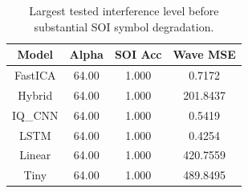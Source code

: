 \begin{table}[t]
\centering
\caption{Largest tested interference level before substantial SOI symbol degradation.}
\label{tab:alpha_robustness}
\begin{tabular}{|c|c|c|c|}
\hline
Model & Alpha & SOI Acc & Wave MSE \\ 
\hline
FastICA & 64.00 & 1.000 & 0.7172 \\ 
Hybrid & 64.00 & 1.000 & 201.8437 \\ 
IQ\_CNN & 64.00 & 1.000 & 0.5419 \\ 
LSTM & 64.00 & 1.000 & 0.4254 \\ 
Linear & 64.00 & 1.000 & 420.7559 \\ 
Tiny & 64.00 & 1.000 & 489.8495 \\ 
\hline
\end{tabular}
\end{table}
